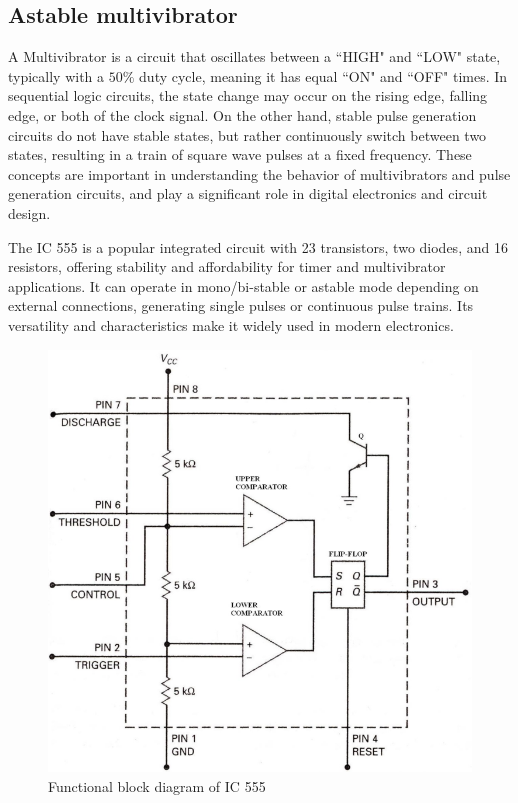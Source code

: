 \subsection{Astable multivibrator}
    A Multivibrator is a circuit that oscillates between a ``HIGH" and ``LOW" state, typically with a $50\%$ duty cycle, meaning it has equal ``ON" and ``OFF" times. In sequential logic circuits, the state change may occur on the rising edge, falling edge, or both of the clock signal. On the other hand, stable pulse generation circuits do not have stable states, but rather continuously switch between two states, resulting in a train of square wave pulses at a fixed frequency. These concepts are important in understanding the behavior of multivibrators and pulse generation circuits, and play a significant role in digital electronics and circuit design.
    
    The IC 555 is a popular integrated circuit with 23 transistors, two diodes, and 16 resistors, offering stability and affordability for timer and multivibrator applications. It can operate in mono/bi-stable or astable mode depending on external connections, generating single pulses or continuous pulse trains. Its versatility and characteristics make it widely used in modern electronics.

    \begin{figure}[h]
        \centering
        \includegraphics[width=1\columnwidth]{images/555a.png}
        \caption{Functional block diagram of IC 555}
        \label{th:3}
    \end{figure}


